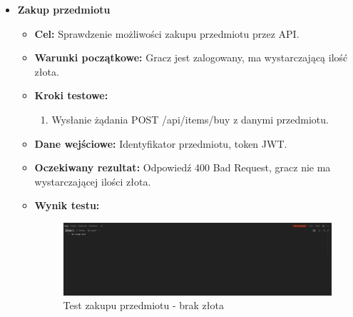 \begin{itemize}
    \item \textbf{Zakup przedmiotu}
    \begin{itemize}
        \item \textbf{Cel:} Sprawdzenie możliwości zakupu przedmiotu przez API.
        \item \textbf{Warunki początkowe:} Gracz jest zalogowany, ma wystarczającą ilość złota.
        \item \textbf{Kroki testowe:}
        \begin{enumerate}
            \item Wysłanie żądania POST /api/items/buy z danymi przedmiotu.
        \end{enumerate}
        \item \textbf{Dane wejściowe:} Identyfikator przedmiotu, token JWT.
        \item \textbf{Oczekiwany rezultat:} Odpowiedź 400 Bad Request, gracz nie ma wystarczającej ilości złota.
        \item \textbf{Wynik testu:}
        \begin{figure}[H]
            \includegraphics[width=480px]{figures/testy/test-buyitem-fail.png}
            \caption{Test zakupu przedmiotu - brak złota}
        \end{figure}
    \end{itemize}


\end{itemize}
